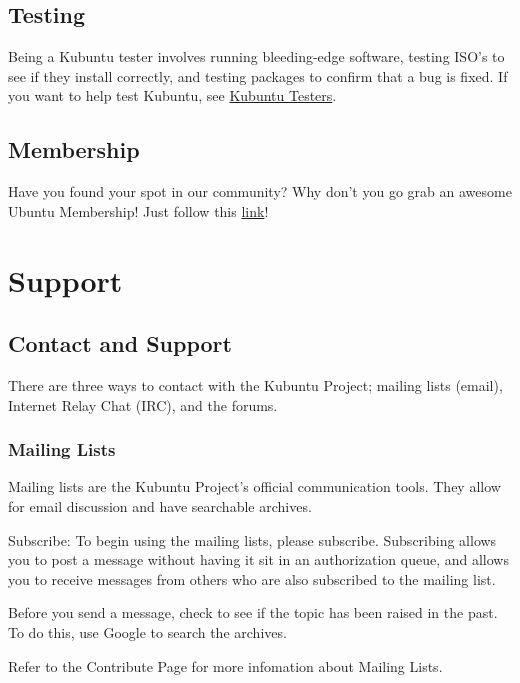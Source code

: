 \documentclass[letterpaper,10pt,english]{sphinxmanual}
\begin{document}
\section{Testing}
\label{\detokenize{docs/contribute:testing}}
Being a Kubuntu tester involves running bleeding-edge software, testing ISO's to see if they install correctly, and testing packages to confirm that a bug is fixed. If you want to help test Kubuntu, see \href{https://wiki.kubuntu.org/KubuntuTesters}{Kubuntu Testers}.


\section{Membership}
\label{\detokenize{docs/contribute:membership}}
Have you found your spot in our community? Why don't you go grab an awesome Ubuntu Membership! Just follow this \href{https://wiki.ubuntu.com/Membership}{link}!


\chapter{Support}
\label{\detokenize{docs/support::doc}}\label{\detokenize{docs/support:support}}\label{\detokenize{docs/support:support-link}}

\section{Contact and Support}
\label{\detokenize{docs/support:contact-and-support}}
There are three ways to contact with the Kubuntu Project; mailing lists (email), Internet Relay Chat (IRC), and the forums.


\subsection{Mailing Lists}
\label{\detokenize{docs/support:mailing-lists}}
Mailing lists are the Kubuntu Project's official communication tools. They allow for email discussion and have searchable archives.

Subscribe:
To begin using the mailing lists, please subscribe. Subscribing allows you to post a message without having it sit in an authorization queue, and allows you to receive messages from others who are also subscribed to the mailing list.

Before you send a message, check to see if the topic has been raised in the past. To do this, use Google to search the archives.

Refer to the Contribute Page for more infomation about Mailing Lists.
\end{document}
